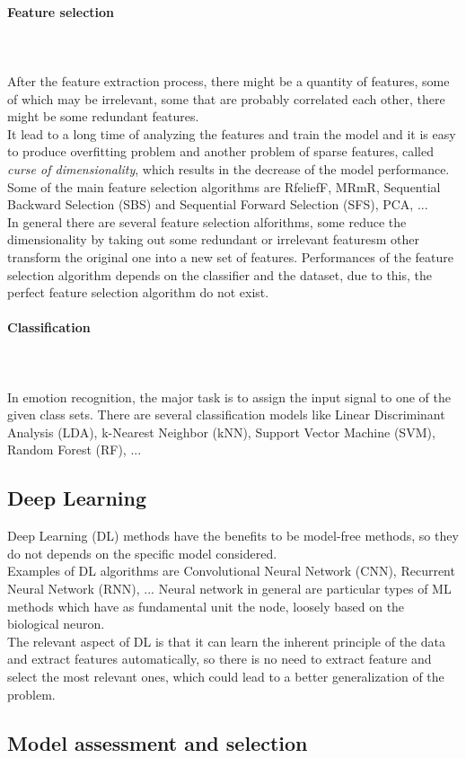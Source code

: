 \paragraph{Feature selection}
\mbox{} \\ \\ \indent
After the feature extraction process, there might be a quantity of features, some of which may be irrelevant, some that are probably correlated each other, there might be some redundant features.
\\
It lead to a long time of analyzing the features and train the model and it is easy to produce overfitting problem and another problem of sparse features, called \textit{curse of dimensionality}, which results in the decrease of the model performance.
\\
Some of the main feature selection algorithms are RfeliefF, MRmR, Sequential Backward Selection (SBS) and Sequential Forward Selection (SFS), PCA, ...
\\ \indent
In general there are several feature selection alforithms, some reduce the dimensionality by taking out some redundant or irrelevant featuresm other transform the original one into a new set of features. Performances of the feature selection algorithm depends on the classifier and the dataset, due to this, the perfect feature selection algorithm do not exist.

\paragraph{Classification}
\mbox{} \\ \\ \indent
In emotion recognition, the major task is to assign the input signal to one of the given class sets. There are several classification models like Linear Discriminant Analysis (LDA), k-Nearest Neighbor (kNN), Support Vector Machine (SVM), Random Forest (RF), ...

\subsection{Deep Learning}
Deep Learning (DL) methods have the benefits to be model-free methods, so they do not depends on the specific model considered.
\\
Examples of DL algorithms are Convolutional Neural Network (CNN), Recurrent Neural Network (RNN), ... Neural network in general are particular types of ML methods which have as fundamental unit the node, loosely based on the biological neuron. 
\\ \indent
The relevant aspect of DL is that it can learn the inherent principle of the data and extract features automatically, so there is no need to extract feature and select the most relevant ones, which could lead to a better generalization of the problem.

\subsection{Model assessment and selection}




